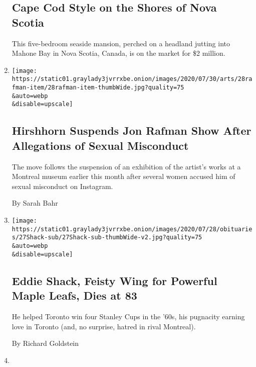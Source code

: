 \begin{enumerate}
  \hypertarget{cape-cod-style-on-the-shores-of-nova-scotia}{%
  \subsection{Cape Cod Style on the Shores of Nova
  Scotia}\label{cape-cod-style-on-the-shores-of-nova-scotia}}

  This five-bedroom seaside mansion, perched on a headland jutting into
  Mahone Bay in Nova Scotia, Canada, is on the market for \$2 million.
\item
  \href{/2020/07/28/arts/design/hirshhorn-museum-jon-rafman.html}{}

  \texttt{[image: https://static01.graylady3jvrrxbe.onion/images/2020/07/30/arts/28rafman-item/28rafman-item-thumbWide.jpg?quality=75\\\&auto=webp\\\&disable=upscale]}

  \hypertarget{hirshhorn-suspends-jon-rafman-show-after-allegations-of-sexual-misconduct}{%
  \subsection{Hirshhorn Suspends Jon Rafman Show After Allegations of
  Sexual
  Misconduct}\label{hirshhorn-suspends-jon-rafman-show-after-allegations-of-sexual-misconduct}}

  The move follows the suspension of an exhibition of the artist's works
  at a Montreal museum earlier this month after several women accused
  him of sexual misconduct on Instagram.

  By Sarah Bahr
\item
  \href{/2020/07/27/sports/hockey/eddie-shack-feisty-wing-for-powerful-maple-leafs-dies-at-83.html}{}

  \texttt{[image: https://static01.graylady3jvrrxbe.onion/images/2020/07/28/obituaries/27Shack-sub/27Shack-sub-thumbWide-v2.jpg?quality=75\\\&auto=webp\\\&disable=upscale]}

  \hypertarget{eddie-shack-feisty-wing-for-powerful-maple-leafs-dies-at-83}{%
  \subsection{Eddie Shack, Feisty Wing for Powerful Maple Leafs, Dies at
  83}\label{eddie-shack-feisty-wing-for-powerful-maple-leafs-dies-at-83}}

  He helped Toronto win four Stanley Cups in the '60s, his pugnacity
  earning love in Toronto (and, no surprise, hatred in rival Montreal).

  By Richard Goldstein
\item
  \href{/2020/07/25/at-home/coronavirus-true-crime-podcasts-race.html}{}


\end{enumerate}
